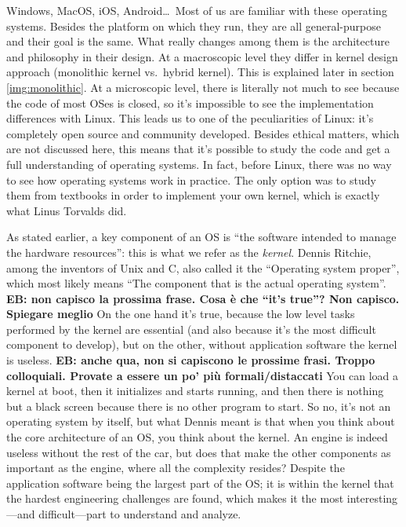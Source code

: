 \documentclass[10pt, oneside]{book}
\newcommand{\mycomment}[1]{\textbf{#1}}  %
\begin{document}
Windows, MacOS, iOS, Android\dots\   Most of us are familiar with these operating systems. Besides the platform on which they run, they are all general-purpose and their goal is the same. What really changes among them is the architecture and philosophy in their design. At a macroscopic level they differ in kernel design approach (monolithic kernel vs.\ hybrid kernel). This is explained later in section \ref{img:monolithic}. At a microscopic level, there is literally not much to see because the code of most OSes is closed, so it's impossible to see the implementation differences with Linux. This leads us to one of the peculiarities of Linux: it's completely open source and community developed. Besides ethical matters, which are not discussed here, this means that it's possible to study the code and get a full understanding of operating systems. In fact, before Linux, there was no way to see how operating systems work in practice. The only option was to study them from textbooks in order to implement your own kernel, which is exactly what Linus Torvalds did.

As stated earlier, a key component of an OS is ``the software intended to manage the hardware resources'': this is what we refer as the \textit{kernel}. Dennis Ritchie, among the inventors of Unix and C, also called it the ``Operating system proper''\cite{ritchie}, which most likely means ``The component that is the actual operating system''. \mycomment{EB: non capisco la prossima frase. Cosa \`e che ``it's true''? Non capisco. Spiegare meglio} On the one hand it's true, because the low level tasks performed by the kernel are essential (and also because it's the most difficult component to develop), but on the other, without application software the kernel is useless. \mycomment{EB: anche qua, non si capiscono le prossime frasi. Troppo colloquiali. Provate a essere un po' pi\`u formali/distaccati} You can load a kernel at boot, then it initializes and starts running, and then there is nothing but a black screen because there is no other program to start. So no, it's not an operating system by itself, but what Dennis meant is that when you think about the core architecture of an OS, you think about the kernel. An engine is indeed useless without the rest of the car, but does that make the other components as important as the engine, where all the complexity resides? Despite the application software being the largest part of the OS; it is within the kernel that the hardest engineering challenges are found, which makes it the most interesting---and difficult---part to understand and analyze.
\end{document}
